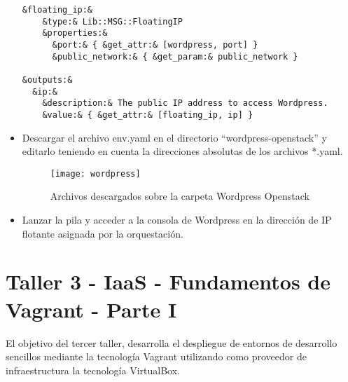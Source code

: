 \documentclass[10pt]{article}   			%
\begin{document}
\begin{itemize}
\begin{small}
\begin{lstlisting}[frame=single,style=base]
  &floating_ip:&
    &type:& Lib::MSG::FloatingIP
    &properties:&
      &port:& { &get_attr:& [wordpress, port] }
      &public_network:& { &get_param:& public_network }

&outputs:&
  &ip:&
    &description:& The public IP address to access Wordpress.
    &value:& { &get_attr:& [floating_ip, ip] }
	\end{lstlisting}
	\end{small}

	\item Descargar el archivo env.yaml en el directorio “wordpress-openstack” y editarlo teniendo en cuenta la direcciones absolutas de los archivos *.yaml.
		\begin{figure}[ht] 
		\centering
			\texttt{[image: wordpress]}   
		\caption{Archivos descargados sobre la carpeta Wordpress Openstack} \label{fig:Wordpress}
	\end{figure}

	\item Lanzar la pila y acceder a la consola de Wordpress en la dirección de IP flotante asignada por la orquestación.
			
\end{itemize}
			
\newpage %

\section{Taller 3 - IaaS - Fundamentos de Vagrant - Parte I}

El objetivo del tercer taller, desarrolla el despliegue de entornos de desarrollo sencillos mediante la tecnología Vagrant utilizando como proveedor de infraestructura la tecnología VirtualBox.
\end{document}
